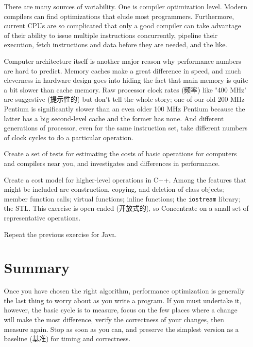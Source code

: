 There are many sources of variability. One is compiler optimization level.
Modern compilers can find optimizations that elude most programmers.
Furthermore, current CPUs are so complicated that only a good compiler can
take advantage of their ability to issue multiple instructions
concurrently, pipeline their execution, fetch instructions and data before
they are needed, and the like.

Computer architecture itself is another major reason why performance
numbers are hard to predict. Memory caches make a great difference in
speed, and much cleverness in hardware design goes into hiding the fact
that main memory is quite a bit slower than cache memory. Raw processor
clock rates (频率) like "400 MHz" are suggestive (提示性的) but don't tell
the whole story; one of our old 200 MHz Pentium is significantly slower
than an even older 100 MHz Pentium because the latter has a big
second-level cache and the former has none. And different generations of
processor, even for the same instruction set, take different numbers of
clock cycles to do a particular operation.

\begin{exercise}
    Create a set of tests for estimating the costs of basic operations for
    computers and compilers near you, and investigates and differences in
    performance.
\end{exercise}

\begin{exercise}
    Create a cost model for higher-level operations in C++. Among the
    features that might be included are construction, copying, and deletion
    of class objects; member function calls; virtual functions; inline
    functions; the \verb'iostream' library; the STL. This exercise is
    open-ended (开放式的), so Concentrate on a small set of representative
    operations.
\end{exercise}

\begin{exercise}
    Repeat the previous exercise for Java.
\end{exercise}

\section{Summary}

Once you have chosen the right algorithm, performance optimization is
generally the last thing to worry about as you write a program. If you must
undertake it, however, the basic cycle is to measure, focus on the few
places where a change will make the most difference, verify the correctness
of your changes, then measure again. Stop as soon as you can, and preserve
the simplest version as a baseline (基准) for timing and correctness.

